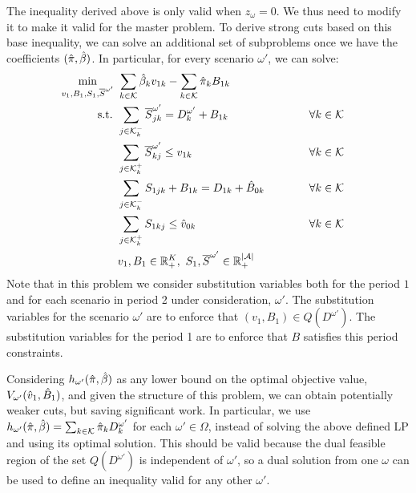 \documentclass[11pt]{article}
\newcommand{\ka}{k} %
\newcommand{\KA}{\mathcal{K}}
\newcommand{\Ka}{K}
\newcommand{\jey}{j} %
\newcommand{\Graf}{\mathcal{A}} %
\newcommand{\Bi}{B} %
\newcommand{\Vi}{v} %
\newcommand{\Es}{S} %
\newcommand{\Zed}{z} %
\newcommand{\m}{\omega} %
\newcommand{\EM}{\Omega} %
\newcommand{\x}{x} %
\newcommand{\Csub}{\mathcal{K}^+_k}
\newcommand{\Psub}{\mathcal{K}^-_k}
\newcommand{\Sc}{\overline{S}}
\begin{document}
The inequality derived above is only valid when $\Zed_\m = 0$. We thus need to modify it to make it valid for the master problem.
To derive strong cuts based on this base inequality, we can solve an additional set of subproblems once we have the coefficients $(\hat{\pi},\hat{\beta})$. In particular, for every scenario $\m'$, we can solve:
\begin{alignat}{2}
\min_{v_1,B_1,\Es_1,\Sc^{\m'}} \ & \sum_{\ka  \in \KA} \betasol_\ka \Vi_{1 \ka} - \sum_{\ka  \in \KA} \pisol_k \Bi_{1  \ka} \notag\\
\text{s.t. } &  \sum_{\jey \in  \Psub} \Sc^{\m'}_{\jey \ka } = D_{\ka}^{\m'} + \Bi_{1  \ka} \ &&\qquad \forall \ka  \in \KA \notag \\
    &\sum_{\jey \in  \Csub} \Sc^{\m'}_{\ka \jey } \leq \Vi_{1 \ka} \ && \qquad\forall \ka  \in \KA \notag \\
    & \sum_{\jey \in  \Psub} {S}_{1 \jey \ka} + \Bi_{1  \ka}  = D_{1 \ka} + \hat{\Bi}_{0 \ka} \quad && \qquad\forall \ka  \in \KA \notag\\
    & \sum_{\jey \in  \Csub} {S}_{1 \ka \jey} \leq \hat{\Vi}_{0 \ka}  && \qquad\forall \ka  \in \KA \notag\\
    & \Vi_1 , \Bi_1 \in \mathbb{R}_{+}^{\Ka}, \ \Es_1, \Sc^{\m'}  \in \mathbb{R}_+^{|\Graf|}  \notag
\end{alignat}
Note that in this problem we consider substitution variables both for the period $1$ and for each scenario in period 2 under consideration, $\m'$. The substitution variables for the scenario $\m'$ are to enforce that $(\Vi_1,\Bi_1) \in Q({D^{\m'}})$. The substitution variables for the period 1 are to enforce that $B$ satisfies this period constraints. 

{Considering $h_{\m'}(\pisol,\betasol)$ as any lower bound on the optimal objective value, $V_{\m'}(\vsol_1,\bsol_1)$, and given the structure of this problem, we can obtain potentially weaker cuts, but saving significant work. In particular, we use $h_{\m'}(\pisol,\betasol) = \sum_{\ka  \in \KA} \pisol_\ka D^{ \m'}_{\ka}$ for each $\m' \in \EM$, instead of solving the above defined LP and using its optimal solution.} This should be valid because the dual feasible region of the set $ Q(D^{\m'})$ is independent of $\m'$, so a dual solution from one $\m$ can be used to define an inequality valid for any other $\m'$.
\end{document}
